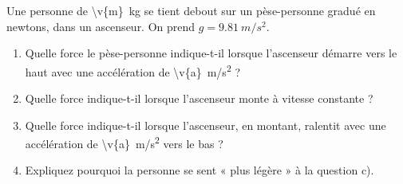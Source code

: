 Une personne de \qty{\v{m}}{kg} se tient debout sur un pèse-personne gradué en newtons, dans un ascenseur. On prend $g = \qty{9.81}{m/s^2}$.

\begin{enumerate}[label=\alph*)]
    \item Quelle force le pèse-personne indique-t-il lorsque l'ascenseur démarre vers le haut avec une accélération de \qty{\v{a}}{m/s^2} ?
    \item Quelle force indique-t-il lorsque l'ascenseur monte à vitesse constante ?
    \item Quelle force indique-t-il lorsque l'ascenseur, en montant, ralentit avec une accélération de \qty{\v{a}}{m/s^2} vers le bas ?
    \item Expliquez pourquoi la personne se sent « plus légère » à la question c).
\end{enumerate}
